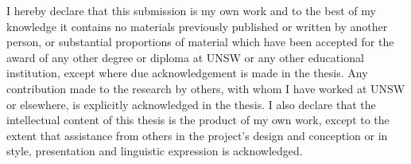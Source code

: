 %
%

\pagebreak
\vspace*{1in}
\noindent{}


\cleardoublepage
\vspace*{1in}
\noindent I hereby declare that this submission is my own work and to the best
of my knowledge it contains no materials previously published or written by
another person, or substantial proportions of material which have been accepted
for the award of any other degree or diploma at UNSW or any other educational
institution, except where due acknowledgement is made in the thesis. Any
contribution made to the research by others, with whom I have worked at UNSW or
elsewhere, is explicitly acknowledged in the thesis. I also declare that the
intellectual content of this thesis is the product of my own work, except to the
extent that assistance from others in the project's design and conception or in
style, presentation and linguistic expression is acknowledged.

\vspace{1in}
\noindent{}

